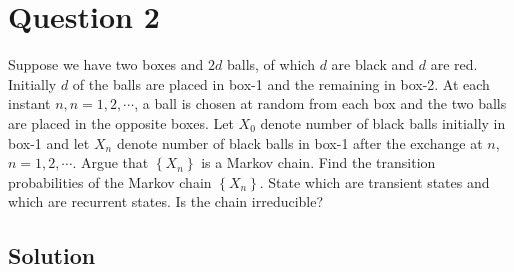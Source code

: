 \section*{Question 2}

Suppose we have two boxes and \( 2 d \) balls, of which \( d \) are black and \( d \) are red.
Initially \( d \) of the balls are placed in box-1 and the remaining in box-2.
At each instant \( n, n=1,2, \cdots \), a ball is chosen at random from each box and the two balls are placed in the opposite boxes.
Let \( X_{0} \) denote number of black balls initially in box-1 and let \( X_{n} \) denote number of black balls in box-1 after the exchange at \( n \), \( n=1,2, \cdots \).
Argue that \( \left \{ X_{n}\right \} \) is a Markov chain.
Find the transition probabilities of the Markov chain \( \left \{ X_{n}\right \} \).
State which are transient states and which are recurrent states.
Is the chain irreducible?

\subsection*{Solution}
